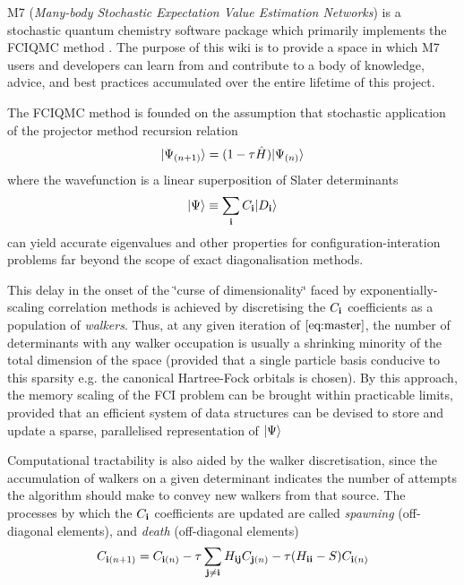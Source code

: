 M7 ({\itshape Many-\/body Stochastic Expectation Value Estimation Networks}) is a stochastic quantum chemistry software package which primarily implements the F\+C\+I\+Q\+MC method \cite{doi:10.1063/1.3193710}. The purpose of this wiki is to provide a space in which M7 users and developers can learn from and contribute to a body of knowledge, advice, and best practices accumulated over the entire lifetime of this project.

The F\+C\+I\+Q\+MC method is founded on the assumption that stochastic application of the projector method recursion relation \[ \label{eq:master} |\Psi_{(n+1)}\rangle = (1-\tau\hat{H})|\Psi_{(n)}\rangle \] where the wavefunction is a linear superposition of Slater determinants \[ \label{eq:psidef} |\Psi\rangle \equiv \sum_{\mathbf{i}} C_{\mathbf{i}} |D_{\mathbf{i}}\rangle \] can yield accurate eigenvalues and other properties for configuration-\/interation problems far beyond the scope of exact diagonalisation methods.

This delay in the onset of the \char`\"{}curse of dimensionality\char`\"{} faced by exponentially-\/scaling correlation methods is achieved by discretising the $C_{\mathbf{i}}$ coefficients as a population of {\itshape walkers}. Thus, at any given iteration of $\eqref{eq:master}$, the number of determinants with any walker occupation is usually a shrinking minority of the total dimension of the space (provided that a single particle basis conducive to this sparsity e.\+g. the canonical Hartree-\/\+Fock orbitals is chosen). By this approach, the memory scaling of the F\+CI problem can be brought within practicable limits, provided that an efficient system of data structures can be devised to store and update a sparse, parallelised representation of $|\Psi\rangle$

Computational tractability is also aided by the walker discretisation, since the accumulation of walkers on a given determinant indicates the number of attempts the algorithm should make to convey new walkers from that source. The processes by which the $C_{\mathbf{i}}$ coefficients are updated are called {\itshape spawning} (off-\/diagonal elements), and {\itshape death} (off-\/diagonal elements) \[ C_{\mathbf{i}(n+1)} = C_{\mathbf{i}(n)} - \tau \sum_{\mathbf{j}\neq\mathbf{i}} H_{\mathbf{i}\mathbf{j}} C_{\mathbf{j}(n)} - \tau(H_{\mathbf{i}\mathbf{i}} - S) C_{\mathbf{i}(n)} \] 